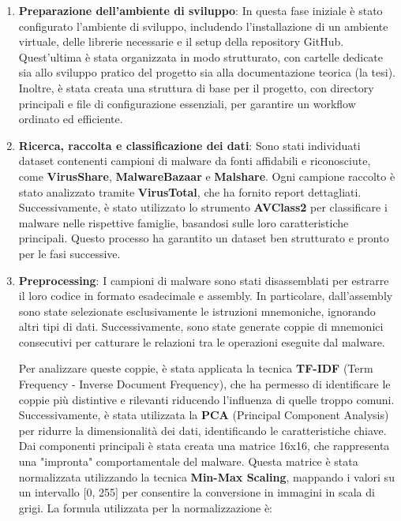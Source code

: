 \begin{enumerate}
    \item \textbf{Preparazione dell'ambiente di sviluppo}: 
    In questa fase iniziale è stato configurato l'ambiente di sviluppo, includendo l'installazione di un ambiente virtuale, delle librerie necessarie e il setup della repository GitHub. Quest'ultima è stata organizzata in modo strutturato, con cartelle dedicate sia allo sviluppo pratico del progetto sia alla documentazione teorica (la tesi). Inoltre, è stata creata una struttura di base per il progetto, con directory principali e file di configurazione essenziali, per garantire un workflow ordinato ed efficiente.

    \item \textbf{Ricerca, raccolta e classificazione dei dati}: 
    Sono stati individuati dataset contenenti campioni di malware da fonti affidabili e riconosciute, come \textbf{VirusShare}, \textbf{MalwareBazaar} e \textbf{Malshare}. Ogni campione raccolto è stato analizzato tramite \textbf{VirusTotal}, che ha fornito report dettagliati. Successivamente, è stato utilizzato lo strumento \textbf{AVClass2} per classificare i malware nelle rispettive famiglie, basandosi sulle loro caratteristiche principali. Questo processo ha garantito un dataset ben strutturato e pronto per le fasi successive.

    \item \textbf{Preprocessing}: 
    I campioni di malware sono stati disassemblati per estrarre il loro codice in formato esadecimale e assembly. In particolare, dall'assembly sono state selezionate esclusivamente le istruzioni mnemoniche, ignorando altri tipi di dati. Successivamente, sono state generate coppie di mnemonici consecutivi per catturare le relazioni tra le operazioni eseguite dal malware. 

    Per analizzare queste coppie, è stata applicata la tecnica \textbf{TF-IDF} (Term Frequency - Inverse Document Frequency), che ha permesso di identificare le coppie più distintive e rilevanti riducendo l'influenza di quelle troppo comuni. Successivamente, è stata utilizzata la \textbf{PCA} (Principal Component Analysis) per ridurre la dimensionalità dei dati, identificando le caratteristiche chiave. Dai componenti principali è stata creata una matrice 16x16, che rappresenta una "impronta" comportamentale del malware. Questa matrice è stata normalizzata utilizzando la tecnica \textbf{Min-Max Scaling}, mappando i valori su un intervallo [0, 255] per consentire la conversione in immagini in scala di grigi. La formula utilizzata per la normalizzazione è:


\end{enumerate}
